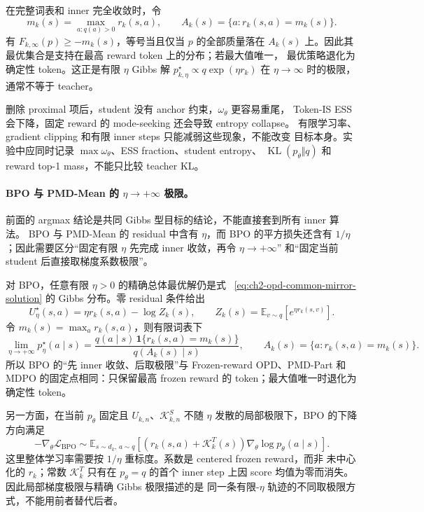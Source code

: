 在完整词表和 inner 完全收敛时，令
\begin{equation}
m_k(s)=\max_{a:q(a)>0}r_k(s,a),\qquad
A_k(s)=\{a:r_k(s,a)=m_k(s)\}.
\end{equation}
有 $F_{k,\infty}(p)\geq-m_k(s)$，等号当且仅当 $p$ 的全部质量落在
$A_k(s)$ 上。因此其最优集合是支持在最高 reward token 上的分布；若最大值唯一，
最优策略退化为确定性 token。这正是有限 $\eta$ Gibbs 解
$p_{k,\eta}^\star\propto q\exp(\eta r_k)$ 在 $\eta\to\infty$ 时的极限，
通常不等于 teacher。

删除 proximal 项后，student 没有 anchor 约束，$\omega_\theta$ 更容易重尾，
Token-IS ESS 会下降，固定 reward 的 mode-seeking 还会导致 entropy collapse。
有限学习率、gradient clipping 和有限 inner steps 只能减弱这些现象，不能改变
目标本身。实验中应同时记录 $\max\omega_\theta$、ESS fraction、student entropy、
$\operatorname{KL}(p_\theta\Vert q)$ 和 reward top-1 mass，不能只比较 teacher KL。

\paragraph{BPO 与 PMD-Mean 的 $\eta\to+\infty$ 极限。}
前面的 argmax 结论是共同 Gibbs 型目标的结论，不能直接套到所有 inner 算法。
BPO 与 PMD-Mean 的 residual 中含有 $\eta$，而 BPO 的平方损失还含有
$1/\eta$；因此需要区分“固定有限 $\eta$ 先完成 inner 收敛，再令 $\eta\to+\infty$”
和“固定当前 student 后直接取梯度系数极限”。

对 BPO，任意有限 $\eta>0$ 的精确总体最优解仍是式
~\eqref{eq:ch2-opd-common-mirror-solution} 的 Gibbs 分布。零 residual 条件给出
\begin{equation}
U^\star_\eta(s,a)=\eta r_k(s,a)-\log Z_k(s),
\qquad
Z_k(s)=\mathbb E_{v\sim q}\left[e^{\eta r_k(s,v)}\right].
\end{equation}
令 $m_k(s)=\max_a r_k(s,a)$，则有限词表下
\begin{equation}
\lim_{\eta\to+\infty}p^\star_{\eta}(a\mid s)
=\frac{q(a\mid s)\,\mathbf 1\{r_k(s,a)=m_k(s)\}}
{q(A_k(s)\mid s)},
\qquad A_k(s)=\{a:r_k(s,a)=m_k(s)\}.
\label{eq:ch2-opd-bpo-infinity-target}
\end{equation}
所以 BPO 的“先 inner 收敛、后取极限”与 Frozen-reward OPD、PMD-Part 和
MDPO 的固定点相同：只保留最高 frozen reward 的 token；最大值唯一时退化为
确定性 token。

另一方面，在当前 $p_\theta$ 固定且 $U_{k,n}$、$\mathcal K^S_{k,n}$ 不随
$\eta$ 发散的局部极限下，BPO 的下降方向满足
\begin{equation}
-\nabla_\theta\mathcal L_{\mathrm{BPO}}
\sim
\mathbb E_{s\sim d_k,\,a\sim q}
\left[(r_k(s,a)+\mathcal K_k^T(s))
\nabla_\theta\log p_\theta(a\mid s)\right].
\label{eq:ch2-opd-bpo-infinity-gradient}
\end{equation}
这里整体学习率需要按 $1/\eta$ 重标度。系数是 centered frozen reward，而非
未中心化的 $r_k$；常数 $\mathcal K_k^T$ 只有在 $p_\theta=q$ 的首个 inner
step 上因 score 均值为零而消失。因此局部梯度极限与精确 Gibbs 极限描述的是
同一条有限-$\eta$ 轨迹的不同取极限方式，不能用前者替代后者。

